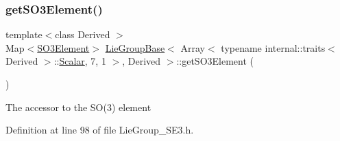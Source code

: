 \subsubsection{\texorpdfstring{get\+S\+O3\+Element()}{getSO3Element()}\hspace{0.1cm}{\footnotesize\ttfamily [1/2]}}
{\footnotesize\ttfamily template$<$class Derived $>$ \\
Map$<$\hyperlink{class_lie_group_base_3_01_array_3_01typename_01internal_1_1traits_3_01_derived_01_4_1_1_scalar_0d6d4b5459662fc32c7117aee50362fb1_a2594349e8f4329af620dff380a457890}{S\+O3\+Element}$>$ \hyperlink{class_lie_group_base}{Lie\+Group\+Base}$<$ Array$<$ typename internal\+::traits$<$ Derived $>$\+::\hyperlink{class_lie_group_base_3_01_array_3_01typename_01internal_1_1traits_3_01_derived_01_4_1_1_scalar_0d6d4b5459662fc32c7117aee50362fb1_a831695c575380c9a1df32eff9fc4a8c6}{Scalar}, 7, 1 $>$, Derived $>$\+::get\+S\+O3\+Element (\begin{DoxyParamCaption}{ }\end{DoxyParamCaption})\hspace{0.3cm}{\ttfamily [inline]}}

The accessor to the S\+O(3) element 

Definition at line 98 of file Lie\+Group\+\_\+\+S\+E3.\+h.

\hypertarget{class_lie_group_base_3_01_array_3_01typename_01internal_1_1traits_3_01_derived_01_4_1_1_scalar_0d6d4b5459662fc32c7117aee50362fb1_afb657a659f0ab1ef96925dd9f371ca0b}{}\label{class_lie_group_base_3_01_array_3_01typename_01internal_1_1traits_3_01_derived_01_4_1_1_scalar_0d6d4b5459662fc32c7117aee50362fb1_afb657a659f0ab1ef96925dd9f371ca0b} 
